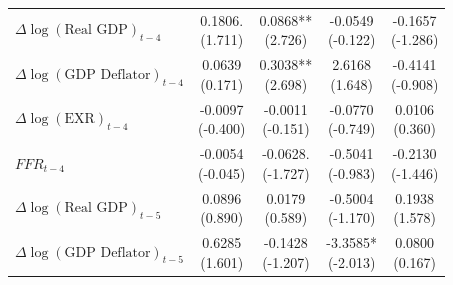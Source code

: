 \documentclass[12pt]{article}
\begin{document}
\begin{enumerate}[label=\arabic*.]
\begin{table}[htbp]
\begin{tabular}{lcccc}
        $\Delta\log(\text{Real GDP})_{t-4}$
        & \makecell{0.1806.\\(1.711)}
        & \makecell{0.0868**\\(2.726)}
        & \makecell{-0.0549\\(-0.122)}
        & \makecell{-0.1657\\(-1.286)} \\
        
        $\Delta\log(\text{GDP Deflator})_{t-4}$
        & \makecell{0.0639\\(0.171)}
        & \makecell{0.3038**\\(2.698)}
        & \makecell{2.6168\\(1.648)}
        & \makecell{-0.4141\\(-0.908)} \\
        
        $\Delta\log(\text{EXR})_{t-4}$
        & \makecell{-0.0097\\(-0.400)}
        & \makecell{-0.0011\\(-0.151)}
        & \makecell{-0.0770\\(-0.749)}
        & \makecell{0.0106\\(0.360)} \\
        
        $FFR_{t-4}$
        & \makecell{-0.0054\\(-0.045)}
        & \makecell{-0.0628.\\(-1.727)}
        & \makecell{-0.5041\\(-0.983)}
        & \makecell{-0.2130\\(-1.446)} \\
        
        $\Delta\log(\text{Real GDP})_{t-5}$
        & \makecell{0.0896\\(0.890)}
        & \makecell{0.0179\\(0.589)}
        & \makecell{-0.5004\\(-1.170)}
        & \makecell{0.1938\\(1.578)} \\
        
        $\Delta\log(\text{GDP Deflator})_{t-5}$
        & \makecell{0.6285\\(1.601)}
        & \makecell{-0.1428\\(-1.207)}
        & \makecell{-3.3585*\\(-2.013)}
        & \makecell{0.0800\\(0.167)} \\
        

\end{tabular}
\end{table}
\end{enumerate}
\end{document}
